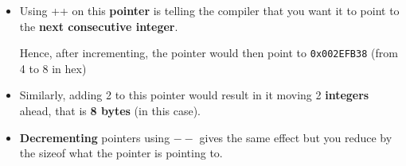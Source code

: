 \documentclass[10pt]{article}
\begin{document}
\begin{itemize}
\item Using ++ on this \textbf{pointer} is telling the compiler that you want it to point to the \textbf{next consecutive integer}.

	Hence, after incrementing, the pointer would then point to \verb|0x002EFB38| (from 4 to 8 in hex)

\item Similarly, adding 2 to this pointer would result in it moving 2 \textbf{integers} ahead, that is \textbf{8 bytes} (in this case).

\item \textbf{Decrementing} pointers using $--$ gives the same effect but you reduce by the sizeof what the pointer is pointing to.
\end{itemize}

\newpage
\end{document}

